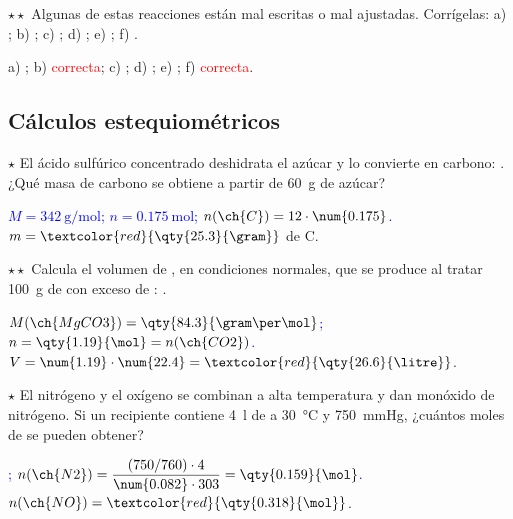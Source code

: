 \begin{exercise}
    \(\star\star\) Algunas de estas reacciones están mal escritas o mal ajustadas. Corrígelas: a) ; b) ; c) ; d) ;
    e) ; f) .
    \begin{solu}
        a) \textcolor{red}{}; b) \textcolor{red}{correcta}; c) \textcolor{red}{}; d) \textcolor{red}{}; e) \textcolor{red}{};
        f) \textcolor{red}{correcta}.
    \end{solu}
\end{exercise}

\subsection{Cálculos estequiométricos}

\begin{exercise}
    \(\star\) El ácido sulfúrico concentrado deshidrata el azúcar y lo convierte en carbono: . ¿Qué masa de carbono se obtiene a partir de \qty{60}{\gram} de azúcar?
    \begin{solu}
        \textcolor{blue}{\(M = \qty{342}{\gram\per\mol}\); \(n = \qty{0.175}{\mol}\); \(n(\ch{C}) = 12 \cdot \num{0.175}\).}
        \(m = \textcolor{red}{\qty{25.3}{\gram}}\) de C.
    \end{solu}
\end{exercise}

\begin{exercise}
    \(\star\star\) Calcula el volumen de , en condiciones normales, que se produce al tratar \qty{100}{\gram} de 
    con exceso de : .
    \begin{solu}
        \textcolor{blue}{\(M(\ch{MgCO3}) = \qty{84.3}{\gram\per\mol}\); \(n = \qty{1.19}{\mol} = n(\ch{CO2})\).}
        \(V = \num{1.19} \cdot \num{22.4} = \textcolor{red}{\qty{26.6}{\litre}}\).
    \end{solu}
\end{exercise}

\begin{exercise}
    \(\star\) El nitrógeno y el oxígeno se combinan a alta temperatura y dan monóxido de nitrógeno. Si un recipiente contiene
    \qty{4}{\litre} de  a \qty{30}{\degreeCelsius} y \qty{750}{\mmHg}, ¿cuántos moles de  se pueden obtener?
    \begin{solu}
        \textcolor{blue}{; \(n(\ch{N2}) = \dfrac{(750/760) \cdot 4}{\num{0.082} \cdot 303} = \qty{0.159}{\mol}\).}
        \(n(\ch{NO}) = \textcolor{red}{\qty{0.318}{\mol}}\).
    \end{solu}
\end{exercise}

